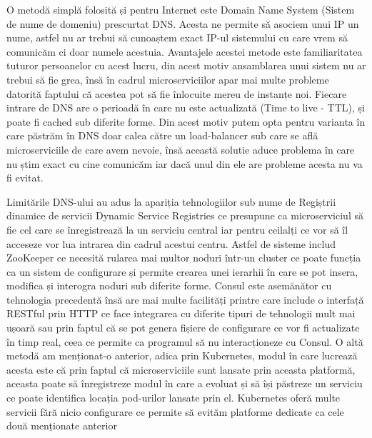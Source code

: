 O metodă simplă folosită și pentru Internet este Domain Name System (Sistem de nume de domeniu)
prescurtat DNS. Acesta ne permite să asociem unui IP un nume, astfel nu ar trebui să cunoaștem exact
IP-ul sistemului cu care vrem să comunicăm ci doar numele acestuia. Avantajele acestei metode este
familiaritatea tuturor persoanelor cu acest lucru, din acest motiv ansamblarea unui sistem nu ar 
trebui să fie grea, însă în cadrul microserviciilor apar mai multe probleme datorită faptului că
acestea pot să fie înlocuite mereu de instanțe noi. Fiecare intrare de DNS are o perioadă în care
nu este actualizată (Time to live - TTL), și poate fi cached sub diferite forme. Din acest motiv 
putem opta pentru varianta în care păstrăm în DNS doar calea către un load-balancer sub care 
se află microserviciile de care avem nevoie, însă această solutie aduce problema în care nu știm 
exact cu cine comunicăm iar dacă unul din ele are probleme acesta nu va fi evitat.

Limitările DNS-ului au adus la apariția tehnologiilor sub nume de Regiștrii dinamice de servicii
Dynamic Service Registries ce presupune ca microserviciul să fie cel care se înregistrează
la un serviciu central iar pentru ceilalți ce vor să îl acceseze vor lua intrarea din cadrul
acestui centru. Astfel de sisteme includ ZooKeeper ce necesită rularea mai multor noduri 
într-un cluster ce poate funcția ca un sistem de configurare și permite crearea unei ierarhii
în care se pot insera, modifica și interogra noduri sub diferite forme. Consul este asemănător 
cu tehnologia precedentă însă are mai multe facilități printre care include o interfață
RESTful prin HTTP ce face integrarea cu diferite tipuri de tehnologii mult mai ușoară 
sau prin faptul că se pot genera fișiere de configurare ce vor fi actualizate în timp real, ceea
ce permite ca programul să nu interacționeze cu Consul. O altă metodă am menționat-o anterior,
adica prin Kubernetes, modul în care lucrează acesta este că prin faptul că microserviciile 
sunt lansate prin aceasta platformă, aceasta poate să înregistreze modul în care a evoluat
și să își păstreze un serviciu ce poate identifica locația pod-urilor lansate prin el.
Kubernetes oferă multe servicii fără nicio configurare ce permite să evităm platforme dedicate
ca cele două menționate anterior 